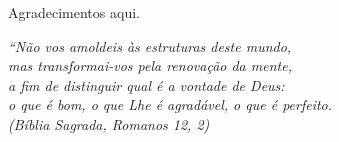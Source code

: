 \documentclass[
12pt,				%
openright,			%
twoside,			%
a4paper,			%
hyphens,
english,			%
brazil				%
]{abntex2}
\begin{document}
		
		
	
	\begin{agradecimentos}
		Agradecimentos aqui.	
	\end{agradecimentos}
	
	\begin{epigrafe}
		\vspace*{\fill}
		\begin{flushright}
			\textit{``Não vos amoldeis às estruturas deste mundo, \\
				mas transformai-vos pela renovação da mente, \\
				a fim de distinguir qual é a vontade de Deus: \\
				o que é bom, o que Lhe é agradável, o que é perfeito.\\
				(Bíblia Sagrada, Romanos 12, 2)}
		\end{flushright}
	\end{epigrafe}
	
\end{document}
